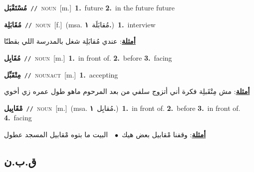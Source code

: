 \documentclass[10pt,a4paper,twoside]{article} %
\begin{document}
\begin{multicols}{2}
{{{{{{{{{{{{\setlength\topsep{0pt}\textbf{\foreignlanguage{arabic}{مُسْتَقْبَل}}\ {\color{gray}\texttt{//}\color{black}}\ \textsc{noun}\ [m.]\ \textbf{1.}~future  \textbf{2.}~in the future future\ 

{\setlength\topsep{0pt}\textbf{\foreignlanguage{arabic}{مُقَابَلِة}}\ {\color{gray}\texttt{//}\color{black}}\ \textsc{noun}\ [f.]\ \color{gray}(msa. \foreignlanguage{arabic}{مُقابَلَة}~\foreignlanguage{arabic}{\textbf{١.}})\color{black}\ \textbf{1.}~interview\  \begin{flushright}\color{gray}\foreignlanguage{arabic}{\textbf{\underline{\foreignlanguage{arabic}{أمثلة}}}: عندي مُقابَلِة شغل بالمدرسة اللي بقطنّا}\end{flushright}\color{black}} \vspace{2mm}

{\setlength\topsep{0pt}\textbf{\foreignlanguage{arabic}{مُقَابِل}}\ {\color{gray}\texttt{//}\color{black}}\ \textsc{noun}\ [m.]\ \textbf{1.}~in front of.  \textbf{2.}~before  \textbf{3.}~facing\ 

{\setlength\topsep{0pt}\textbf{\foreignlanguage{arabic}{مِتْقَبِّل}}\ {\color{gray}\texttt{//}\color{black}}\ \textsc{noun\textunderscore act}\ [m.]\ \textbf{1.}~accepting\  \begin{flushright}\color{gray}\foreignlanguage{arabic}{\textbf{\underline{\foreignlanguage{arabic}{أمثلة}}}: مش مِتْقَبلِة فكرة أني أتزوج سلفي من بعد المرحوم ماهو طول عمره زي أخوي}\end{flushright}\color{black}} \vspace{2mm}

{\setlength\topsep{0pt}\textbf{\foreignlanguage{arabic}{مْقَابِيل}}\ {\color{gray}\texttt{//}\color{black}}\ \textsc{noun}\ [m.]\ \color{gray}(msa. \foreignlanguage{arabic}{مُقابِل}~\foreignlanguage{arabic}{\textbf{١.}})\color{black}\ \textbf{1.}~in front of.  \textbf{2.}~before  \textbf{3.}~in front of.  \textbf{4.}~facing\  \begin{flushright}\color{gray}\foreignlanguage{arabic}{\textbf{\underline{\foreignlanguage{arabic}{أمثلة}}}: وقفنا مْقابيل بعض هيك\ $\bullet$\ \  البيت ما بتوه مْقابيل المسجد عطول}\end{flushright}\color{black}} \vspace{2mm}

\vspace{-3mm}
\subsection*{\color{blue}\foreignlanguage{arabic}{ق.ب.ن}\color{blue}{}} 

}}}}}}}}}}}}}
\end{multicols}
\end{document}

